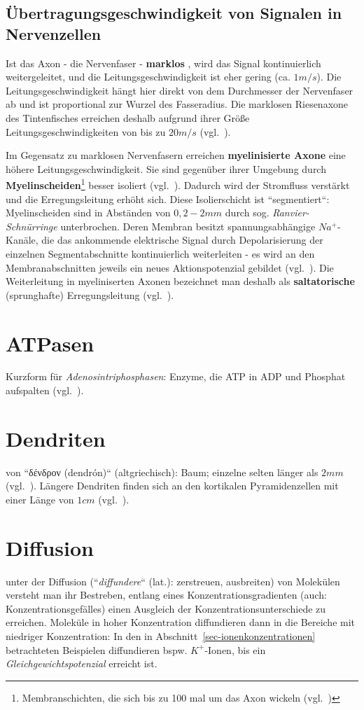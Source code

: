\subsection{Übertragungsgeschwindigkeit von Signalen in Nervenzellen}
Ist das Axon - die Nervenfaser - \textbf{marklos} , wird das Signal kontinuierlich weitergeleitet, und die Leitungsgeschwindigkeit ist eher gering (ca. $1m/s$).
Die Leitungsgeschwindigkeit hängt hier direkt von dem Durchmesser der Nervenfaser ab und ist proportional zur Wurzel des Fasseradius.
Die marklosen Riesenaxone des Tintenfisches erreichen deshalb aufgrund ihrer Größe Leitungsgeschwindigkeiten von bis zu $20 m/s$ (vgl.~\cite[79]{Jon19}).

Im Gegensatz zu marklosen Nervenfasern erreichen \textbf{myelinisierte Axone} eine höhere Leitungsgeschwindigkeit.
Sie sind gegenüber ihrer Umgebung durch \textbf{Myelinscheiden}\footnote{
    Membranschichten, die sich bis zu 100 mal um das Axon wickeln (vgl.~\cite[79]{Jon19})
} besser isoliert (vgl.~\cite[48]{SD07}).
Dadurch wird der Stromfluss verstärkt und die Erregungsleitung erhöht sich.
Diese Isolierschicht ist ``segmentiert``: Myelinscheiden sind in Abständen von $0,2 - 2mm$ durch sog.  \textit{Ranvier-Schnürringe} unterbrochen.
Deren Membran besitzt spannungsabhängige $Na^+$-Kanäle, die das ankommende elektrische Signal durch  Depolarisierung der einzelnen Segmentabschnitte kontinuierlich weiterleiten - es wird an den Membranabschnitten jeweils ein neues Aktionspotenzial gebildet (vgl.~\cite[48]{SD07}).
Die Weiterleitung in myeliniserten Axonen bezeichnet man deshalb als \textbf{saltatorische} (sprunghafte) Erregungsleitung (vgl.~\cite[109 f.]{BCP18}).

\section{ATPasen}\label{appendix:atpasen}
Kurzform für \textit{Adenosintriphosphasen}: Enzyme, die ATP in ADP und Phosphat aufspalten (vgl.~\cite[26]{SD07}).

\section{Dendriten}\label{appendix:dendriten}
von ``\textgreek{δένδρον} (dendrón)`` (altgriechisch): Baum; einzelne selten länger als $2 mm$ (vgl.~\cite[28]{BCP18}).
Längere Dendriten finden sich an den kortikalen Pyramidenzellen mit einer Länge von $1 cm$ (vgl.~\cite[58]{Eil19}).

\section{Diffusion}\label{appendix:diffusion}
unter der Diffusion (``\textit{diffundere}`` (lat.): zerstreuen, ausbreiten) von Molekülen versteht man ihr Bestreben, entlang eines Konzentrationsgradienten (auch: Konzentrationsgefälles) einen Ausgleich der Konzentrationsunterschiede zu erreichen.
Moleküle in hoher Konzentration diffundieren dann in die Bereiche mit niedriger Konzentration: In den in Abschnitt~\ref{sec-ionenkonzentrationen} betrachteten Beispielen diffundieren bspw. $K^+$-Ionen, bis ein \textit{Gleichgewichtspotenzial} erreicht ist.

